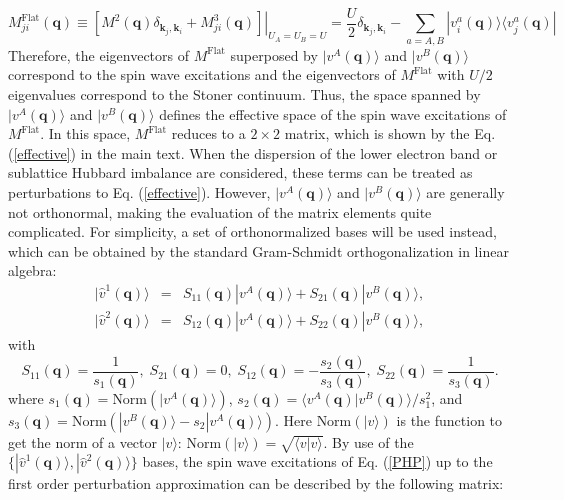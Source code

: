\documentclass[amsmath,superscriptaddress,showpacs,aps,prl,twocolumn]{revtex4-1}
\begin{document}
\begin{equation*}
M^\text{Flat}_{ji}(\mathbf{q})\equiv\left.\left[M^2(\mathbf{q})\delta_{\mathbf{k}_j,\mathbf{k}_i}+M^3_{ji}(\mathbf{q})\right]\right|_{U_A=U_B=U}
=\frac{U}{2}\delta_{\mathbf{k}_j,\mathbf{k}_i}-\sum_{a=A,B}|v^a_i(\mathbf{q})\rangle\langle v^a_j(\mathbf{q})|
\end{equation*}
Therefore, the eigenvectors of $M^\text{Flat}$ superposed by $|v^A(\mathbf{q})\rangle$ and $|v^B(\mathbf{q})\rangle$ correspond to the spin wave excitations and the eigenvectors of $M^\text{Flat}$ with $U/2$ eigenvalues correspond to the Stoner continuum. Thus, the space spanned by $|v^A(\mathbf{q})\rangle$ and $|v^B(\mathbf{q})\rangle$ defines the effective space of the spin wave excitations of $M^\text{Flat}$. In this space, $M^\text{Flat}$ reduces to a $2\times2$ matrix, which is shown by the Eq. (\ref{effective}) in the main text. When the dispersion of the lower electron band or sublattice Hubbard imbalance are considered, these terms can be treated as perturbations to Eq. (\ref{effective}). However, $|v^A(\mathbf{q})\rangle$ and $|v^B(\mathbf{q})\rangle$ are generally not orthonormal, making the evaluation of the matrix elements quite complicated. For simplicity, a set of orthonormalized bases will be used instead, which can be obtained by the standard Gram-Schmidt orthogonalization in linear algebra:
\begin{eqnarray*}
|\hat{v}^1(\mathbf{q})\rangle&=&S_{11}(\mathbf{q})|v^A(\mathbf{q})\rangle+S_{21}(\mathbf{q})|v^B(\mathbf{q})\rangle,\\
|\hat{v}^2(\mathbf{q})\rangle&=&S_{12}(\mathbf{q})|v^A(\mathbf{q})\rangle+S_{22}(\mathbf{q})|v^B(\mathbf{q})\rangle,
\end{eqnarray*}
with
\begin{equation}\label{Schmidt}
S_{11}(\mathbf{q})=\frac{1}{s_1(\mathbf{q})},\;
S_{21}(\mathbf{q})=0,\;
S_{12}(\mathbf{q})=-\frac{s_2(\mathbf{q})}{s_3(\mathbf{q})},\;
S_{22}(\mathbf{q})=\frac{1}{s_3(\mathbf{q})}.
\end{equation}
where $s_1(\mathbf{q})=\text{Norm}(|v^A(\mathbf{q})\rangle)$, $s_2(\mathbf{q})=\langle v^A(\mathbf{q})|v^B(\mathbf{q})\rangle/s_1^2$, and $s_3(\mathbf{q})=\text{Norm}(|v^B(\mathbf{q})\rangle-s_2|v^A(\mathbf{q})\rangle)$. Here $\text{Norm}(|v\rangle)$ is the function to get the norm of a vector $|v\rangle$: $\text{Norm}(|v\rangle)=\sqrt{\langle v|v\rangle}$. By use of the $\{|\hat{v}^1(\mathbf{q})\rangle,|\hat{v}^2(\mathbf{q})\rangle\}$ bases, the spin wave excitations of Eq. (\ref{PHP}) up to the first order perturbation approximation can be described by the following matrix:
\end{document}
